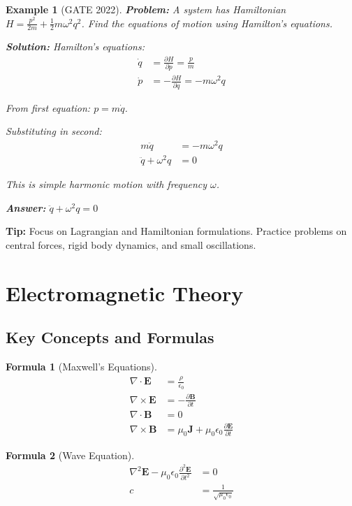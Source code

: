 \documentclass[12pt,a4paper]{article}
\newtheorem{example}{Example}[section]
\newtheorem{formula}{Formula}[section]
\newcommand{\ans}[1]{\textcolor{red!70!black}{\textbf{Answer:} #1}}
\newcommand{\sol}{\textcolor{blue!70!black}{\textbf{Solution:}}}
\newcommand{\tip}[1]{\textcolor{green!60!black}{\textbf{Tip:} #1}}
\begin{document}
\begin{example}[GATE 2022]
\textbf{Problem:} A system has Hamiltonian $H = \frac{p^2}{2m} + \frac{1}{2}m\omega^2 q^2$. Find the equations of motion using Hamilton's equations.

\sol
Hamilton's equations:
\begin{align}
\dot{q} &= \frac{\partial H}{\partial p} = \frac{p}{m}\\
\dot{p} &= -\frac{\partial H}{\partial q} = -m\omega^2 q
\end{align}

From first equation: $p = m\dot{q}$.

Substituting in second:
\begin{align}
m\ddot{q} &= -m\omega^2 q\\
\ddot{q} + \omega^2 q &= 0
\end{align}

This is simple harmonic motion with frequency $\omega$.

\ans{$\ddot{q} + \omega^2 q = 0$}
\end{example}

\tip{Focus on Lagrangian and Hamiltonian formulations. Practice problems on central forces, rigid body dynamics, and small oscillations.}

\section{Electromagnetic Theory}

\subsection{Key Concepts and Formulas}

\begin{formula}[Maxwell's Equations]
\begin{align}
\nabla \cdot \mathbf{E} &= \frac{\rho}{\epsilon_0}\\
\nabla \times \mathbf{E} &= -\frac{\partial \mathbf{B}}{\partial t}\\
\nabla \cdot \mathbf{B} &= 0\\
\nabla \times \mathbf{B} &= \mu_0\mathbf{J} + \mu_0\epsilon_0\frac{\partial \mathbf{E}}{\partial t}
\end{align}
\end{formula}

\begin{formula}[Wave Equation]
\begin{align}
\nabla^2 \mathbf{E} - \mu_0\epsilon_0\frac{\partial^2 \mathbf{E}}{\partial t^2} &= 0\\
c &= \frac{1}{\sqrt{\mu_0\epsilon_0}}
\end{align}
\end{formula}
\end{document}
